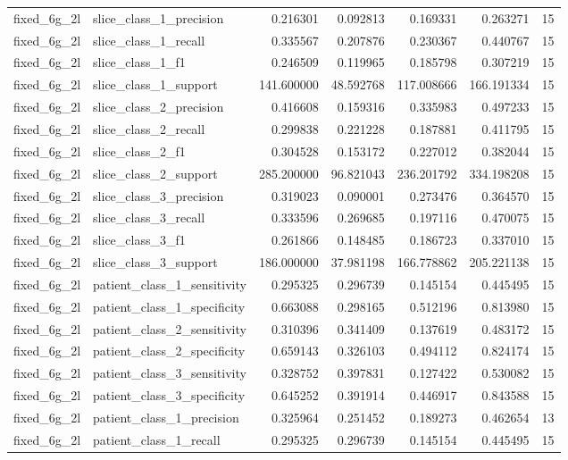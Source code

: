 \begin{tabular}{llrrrrr}
fixed_6g_2l & slice_class_1_precision & 0.216301 & 0.092813 & 0.169331 & 0.263271 & 15 \\
fixed_6g_2l & slice_class_1_recall & 0.335567 & 0.207876 & 0.230367 & 0.440767 & 15 \\
fixed_6g_2l & slice_class_1_f1 & 0.246509 & 0.119965 & 0.185798 & 0.307219 & 15 \\
fixed_6g_2l & slice_class_1_support & 141.600000 & 48.592768 & 117.008666 & 166.191334 & 15 \\
fixed_6g_2l & slice_class_2_precision & 0.416608 & 0.159316 & 0.335983 & 0.497233 & 15 \\
fixed_6g_2l & slice_class_2_recall & 0.299838 & 0.221228 & 0.187881 & 0.411795 & 15 \\
fixed_6g_2l & slice_class_2_f1 & 0.304528 & 0.153172 & 0.227012 & 0.382044 & 15 \\
fixed_6g_2l & slice_class_2_support & 285.200000 & 96.821043 & 236.201792 & 334.198208 & 15 \\
fixed_6g_2l & slice_class_3_precision & 0.319023 & 0.090001 & 0.273476 & 0.364570 & 15 \\
fixed_6g_2l & slice_class_3_recall & 0.333596 & 0.269685 & 0.197116 & 0.470075 & 15 \\
fixed_6g_2l & slice_class_3_f1 & 0.261866 & 0.148485 & 0.186723 & 0.337010 & 15 \\
fixed_6g_2l & slice_class_3_support & 186.000000 & 37.981198 & 166.778862 & 205.221138 & 15 \\
fixed_6g_2l & patient_class_1_sensitivity & 0.295325 & 0.296739 & 0.145154 & 0.445495 & 15 \\
fixed_6g_2l & patient_class_1_specificity & 0.663088 & 0.298165 & 0.512196 & 0.813980 & 15 \\
fixed_6g_2l & patient_class_2_sensitivity & 0.310396 & 0.341409 & 0.137619 & 0.483172 & 15 \\
fixed_6g_2l & patient_class_2_specificity & 0.659143 & 0.326103 & 0.494112 & 0.824174 & 15 \\
fixed_6g_2l & patient_class_3_sensitivity & 0.328752 & 0.397831 & 0.127422 & 0.530082 & 15 \\
fixed_6g_2l & patient_class_3_specificity & 0.645252 & 0.391914 & 0.446917 & 0.843588 & 15 \\
fixed_6g_2l & patient_class_1_precision & 0.325964 & 0.251452 & 0.189273 & 0.462654 & 13 \\
fixed_6g_2l & patient_class_1_recall & 0.295325 & 0.296739 & 0.145154 & 0.445495 & 15 \\

\end{tabular}
